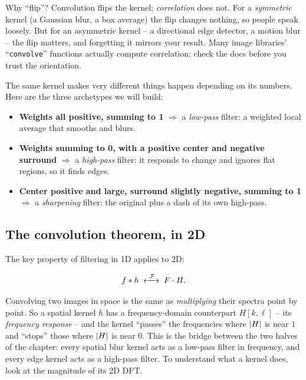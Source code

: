 \begin{walkbox}
Why ``flip''? Convolution flips the kernel; \emph{correlation} does not. For a
\emph{symmetric} kernel (a Gaussian blur, a box average) the flip changes nothing,
so people speak loosely. But for an asymmetric kernel -- a directional edge
detector, a motion blur -- the flip matters, and forgetting it mirrors your result.
Many image libraries' ``\texttt{convolve}'' functions actually compute
correlation; check the docs before you trust the orientation.
\end{walkbox}

The same kernel makes very different things happen depending on its numbers.
Here are the three archetypes we will build:

\begin{itemize}
\item \textbf{Weights all positive, summing to 1} $\Rightarrow$ a \emph{low-pass}
filter: a weighted local average that smooths and blurs.
\item \textbf{Weights summing to 0, with a positive center and negative
surround} $\Rightarrow$ a \emph{high-pass} filter: it responds to change and
ignores flat regions, so it finds edges.
\item \textbf{Center positive and large, surround slightly negative, summing to
1} $\Rightarrow$ a \emph{sharpening} filter: the original plus a dash of its own
high-pass.
\end{itemize}

\subsection{The convolution theorem, in 2D}
\label{ch31:conv-thm}

The key property of filtering in 1D applies to 2D:

\begin{equation}
f \ast h \;\xleftrightarrow{\ \mathcal{F}\ }\; F \cdot H .
\label{ch31:convthm}
\end{equation}

Convolving two images in space is the same as \emph{multiplying} their spectra
point by point. So a spatial kernel $h$ has a frequency-domain counterpart $H[k,\ell]$
-- its \emph{frequency response} -- and the kernel ``passes'' the frequencies where
$\lvert H\rvert$ is near $1$ and ``stops'' those where $\lvert H\rvert$ is near $0$. This is the
bridge between the two halves of the chapter: every spatial blur kernel acts as a
low-pass filter in frequency, and every edge kernel acts as a high-pass
filter. To understand what a kernel does, look at the magnitude of its 2D DFT.


